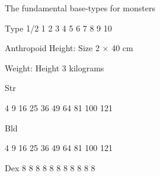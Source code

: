 \documentclass[twoside]{book}
\begin{document}
                    
                    
                    
                    
                    
                  
                  
                  
                    The fundamental base-types for monsters
                    
                  
                  
                   Type   
                   1/2   
                   1   
                   2   
                   3   
                   4   
                   5   
                   6   
                   7   
                   8   
                   9   
                   10   
                  
                  
                   Anthropoid   
                    Height:     
                         Size  2 
                             \ensuremath{\times}    40 
                           cm     
                    
                  
                  
                    
                      Weight:     
                     Height  3    kilograms
                         
                    
                  
                  
                   Str   
                  
                    
                    
                   4   
                   9   
                   16   
                   25   
                   36   
                   49   
                   64   
                   81   
                   100   
                   121   
                  
                  
                   Bld   
                  
                    
                    
                   4   
                   9   
                   16   
                   25   
                   36   
                   49   
                   64   
                   81   
                   100   
                   121   
                  
                  
                   Dex   
                   8   
                   8   
                   8   
                   8   
                   8   
                   8   
                   8   
                   8   
                   8   
                   8   
                   8   
                  
\end{document}
